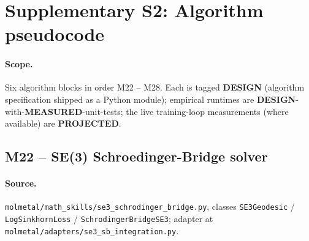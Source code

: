 %

\section*{Supplementary S2: Algorithm pseudocode}

\providecommand{\MEASURED}{\textbf{MEASURED}}
\providecommand{\PROJECTED}{\textbf{PROJECTED}}
\providecommand{\DESIGN}{\textbf{DESIGN}}

\paragraph{Scope.}
Six algorithm blocks in order M22 -- M28.  Each is tagged
\DESIGN{} (algorithm specification shipped as a Python module);
empirical runtimes are \DESIGN{}-with-\MEASURED-unit-tests; the
live training-loop measurements (where available) are
\PROJECTED{}.

\subsection*{M22 -- SE(3) Schroedinger-Bridge solver}
\label{supp:s2-m22}

\paragraph{Source.}
\texttt{molmetal/math\_skills/se3\_schrodinger\_bridge.py},
classes \texttt{SE3Geodesic} / \texttt{LogSinkhornLoss} /
\texttt{SchrodingerBridgeSE3}; adapter at
\texttt{molmetal/adapters/se3\_sb\_integration.py}.

